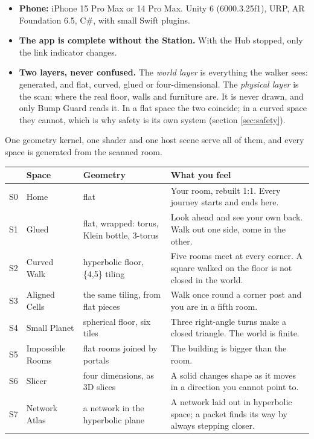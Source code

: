 \documentclass[10pt]{article}
\newcounter{sec}
\newcommand{\Sub}[1]{\Needspace{18mm}\vspace{2.5mm}\noindent{\bfseries\color{accD}#1}\par\vspace{0.3mm}}
\begin{document}
\begin{itemize}
\item \textbf{Phone:} iPhone 15 Pro Max or 14 Pro Max. Unity 6 (6000.3.25f1), URP, AR Foundation 6.5, C\#, with small Swift plugins.
\item \textbf{The app is complete without the Station.} With the Hub stopped, only the link indicator changes.
\item \textbf{Two layers, never confused.} The \emph{world layer} is everything the walker sees: generated, and flat, curved, glued or four-dimensional. The \emph{physical layer} is the scan: where the real floor, walls and furniture are. It is never drawn, and only Bump Guard reads it. In a flat space the two coincide; in a curved space they cannot, which is why safety is its own system (section \ref{sec:safety}).
\end{itemize}

\Sub{The spaces}

One geometry kernel, one shader and one host scene serve all of them, and every space is generated from the scanned room.

\begin{center}\small
\begin{tabularx}{\textwidth}{@{}l l l >{\raggedright\arraybackslash}X@{}}
\toprule
 & \textbf{Space} & \textbf{Geometry} & \textbf{What you feel}\\
\midrule
S0 & Home & flat & Your room, rebuilt 1:1. Every journey starts and ends here.\\
S1 & Glued & flat, wrapped: torus, Klein bottle, 3-torus & Look ahead and see your own back. Walk out one side, come in the other.\\
S2 & Curved Walk & hyperbolic floor, \{4,5\} tiling & Five rooms meet at every corner. A square walked on the floor is not closed in the world.\\
S3 & Aligned Cells & the same tiling, from flat pieces & Walk once round a corner post and you are in a fifth room.\\
S4 & Small Planet & spherical floor, six tiles & Three right-angle turns make a closed triangle. The world is finite.\\
S5 & Impossible Rooms & flat rooms joined by portals & The building is bigger than the room.\\
S6 & Slicer & four dimensions, as 3D slices & A solid changes shape as it moves in a direction you cannot point to.\\
S7 & Network Atlas & a network in the hyperbolic plane & A network laid out in hyperbolic space; a packet finds its way by always stepping closer.\\
\bottomrule
\end{tabularx}
\end{center}
\end{document}
